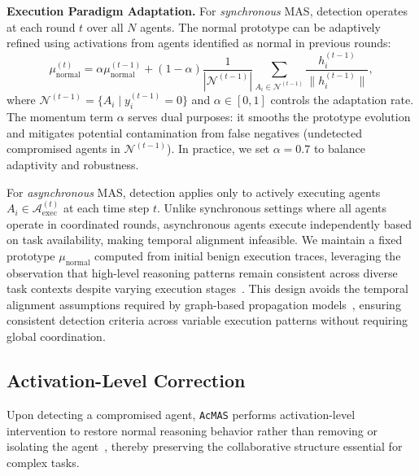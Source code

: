 \documentclass{article}
\newcommand{\app}{\texttt{AcMAS}}
\theoremstyle{plain}
\theoremstyle{definition}
\theoremstyle{remark}
\begin{document}
\noindent\textbf{Execution Paradigm Adaptation.}
For \textit{synchronous} MAS, detection operates at each round $t$ over all
$N$ agents. The normal prototype can be adaptively refined using activations
from agents identified as normal in previous rounds:
\begin{equation}
\mu_{\text{normal}}^{(t)} = \alpha \mu_{\text{normal}}^{(t-1)} +
(1-\alpha) \frac{1}{|\mathcal{N}^{(t-1)}|}
\sum_{A_i \in \mathcal{N}^{(t-1)}} \frac{h_i^{(t-1)}}{\|h_i^{(t-1)}\|},
\label{eq:adaptive_update}
\end{equation}
where $\mathcal{N}^{(t-1)} = \{A_i \mid y_i^{(t-1)} = 0\}$ and
$\alpha \in [0,1]$ controls the adaptation rate.
The momentum term $\alpha$ serves dual purposes: it smooths the prototype 
evolution and mitigates potential contamination from false negatives 
(undetected compromised agents in $\mathcal{N}^{(t-1)}$).
In practice, we set $\alpha = 0.7$ to balance adaptivity and robustness.

For \textit{asynchronous} MAS, detection applies only to actively executing
agents $A_i \in \mathcal{A}_{\text{exec}}^{(t)}$ at each time step $t$.
Unlike synchronous settings where all agents operate in coordinated rounds, 
asynchronous agents execute independently based on task availability, making 
temporal alignment infeasible.
We maintain a fixed prototype $\mu_{\text{normal}}$ computed from initial 
benign execution traces, leveraging the observation that high-level reasoning 
patterns remain consistent across diverse task contexts despite varying 
execution stages~\cite{zhang2025controlling}.
This design avoids the temporal alignment assumptions required by graph-based 
propagation models~\cite{wang2025g}, ensuring consistent detection criteria 
across variable execution patterns without requiring global coordination. 

\subsection{Activation-Level Correction}

Upon detecting a compromised agent, \app{} performs 
activation-level intervention to restore normal reasoning behavior 
rather than removing or isolating the agent~\cite{wang2025g,miao2025blindguard}, 
thereby preserving the collaborative structure essential for complex tasks.
\end{document}
